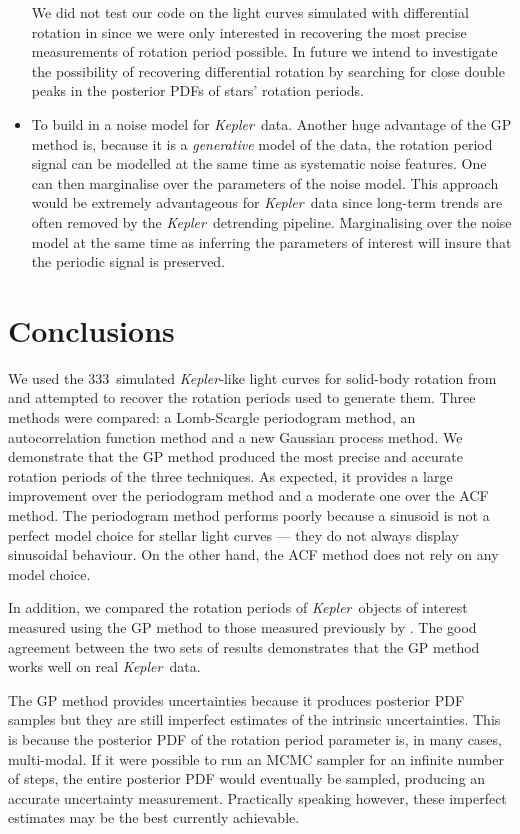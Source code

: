 \documentclass[useAMS, usenatbib, preprint, 12pt]{aastex}
\newcommand{\naigrain}{333}
\newcommand{\Kepler}{{\it Kepler}}
\newcommand{\kepler}{\Kepler}
\begin{document}
\begin{itemize}
{We did not test our code on the light curves simulated with differential
rotation in \citet{Aigrain2015} since we were only interested in recovering
the most precise measurements of rotation period possible.
In future we intend to investigate the possibility of recovering
differential rotation by searching for close double peaks in the posterior
PDFs of stars' rotation periods.}
\item{To build in a noise model for \kepler\ data.
Another huge advantage of the GP method is, because it is a {\it generative}
model of the data, the rotation period signal can be modelled at the same time
as systematic noise features.
One can then marginalise over the parameters of the noise model.
This approach would be extremely advantageous for \kepler\ data since
long-term trends are often removed by the \kepler\ detrending pipeline.
Marginalising over the noise model at the same time as inferring the
parameters of interest will insure that the periodic signal is preserved.}
\end{itemize}

\section{Conclusions}

We used the \naigrain\ simulated \kepler-like light curves for solid-body
rotation from \citet{Aigrain2015} and attempted to recover the rotation
periods used to generate them.
Three methods were compared: a Lomb-Scargle periodogram method, an
autocorrelation function method and a new Gaussian process method.
We demonstrate that the GP method produced the most precise and accurate
rotation periods of the three techniques.
As expected, it provides a large improvement over the periodogram method and a
moderate one over the ACF method.
The periodogram method performs poorly because a sinusoid is not a perfect
model choice for stellar light curves --- they do not always display
sinusoidal behaviour.
On the other hand, the ACF method does not rely on any model choice.

In addition, we compared the rotation periods of \kepler\ objects of
interest measured using the GP method to those measured previously by
\citet{Mcquillan2014}.
The good agreement between the two sets of results demonstrates that the GP
method works well on real \kepler\ data.

The GP method provides uncertainties because it produces posterior PDF samples
but they are still imperfect estimates of the intrinsic uncertainties.
This is because the posterior PDF of the rotation period parameter is, in many
cases, multi-modal.
If it were possible to run an MCMC sampler for an infinite number of steps,
the entire posterior PDF would eventually be sampled, producing an accurate
uncertainty measurement.
Practically speaking however, these imperfect estimates may be the best
currently achievable.
\end{document}
